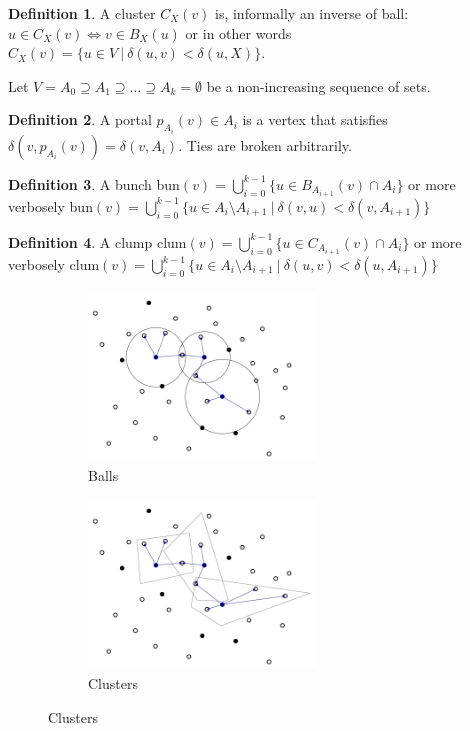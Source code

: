\documentclass[shortabstract, lic, english]{iithesis}
\theoremstyle{definition} \newtheorem{definition}{Definition}[chapter]
\theoremstyle{plain} \newtheorem{remark}[definition]{Observation}
\theoremstyle{plain} \newtheorem{theorem}[definition]{Theorem}
\theoremstyle{plain} \newtheorem{lemma}[definition]{Lemma}
\theoremstyle{plain} \newtheorem{conjecture}[definition]{Conjecture}
\begin{document}
\begin{definition}
    A cluster $C_X(v)$ is, informally an inverse of ball:
    $u\in C_X(v) \iff v\in B_X(u)$ or in other words
    $C_X(v) = \{u \in V ~|~ \delta(u,v) < \delta(u, X)\}$.
\end{definition}

Let $V = A_0 \supseteq A_1 \supseteq \ldots \supseteq A_k = \emptyset$ be a non-increasing 
sequence of sets.

\begin{definition}
    A portal $p_{A_i}(v) \in A_i$ is a vertex that satisfies $\delta(v, p_{A_i}(v)) = \delta(v, A_i)$. Ties are broken arbitrarily. 
\end{definition}

\begin{definition}
    A bunch bun$(v) = \bigcup_{i=0}^{k-1}\{ u \in B_{A_{i+1}}(v) \cap A_i \}$
    or more verbosely bun$(v) = \bigcup_{i=0}^{k-1}\{ u\in A_i \setminus A_{i+1} ~|~ \delta(v,u) < \delta(v, A_{i+1}) \}$
\end{definition}

\begin{definition}
    A clump clum$(v) = \bigcup_{i=0}^{k-1}\{ u \in C_{A_{i+1}}(v) \cap A_i \}$
    or more verbosely clum$(v) = \bigcup_{i=0}^{k-1}\{ u\in A_i \setminus A_{i+1} ~|~ \delta(u,v) < \delta(u, A_{i+1}) \}$
\end{definition}

\begin{figure}[H]
    \centering
    \begin{subfigure}[h]{0.495\textwidth}
        \centering
        \includegraphics[width=6cm]{images/balls}
        \caption{Balls}
    \end{subfigure}
    \begin{subfigure}[h]{0.495\textwidth}
        \centering
        \includegraphics[width=6cm]{images/clusters}
        \caption{Clusters}
    \end{subfigure}
\end{figure}
\end{document}
